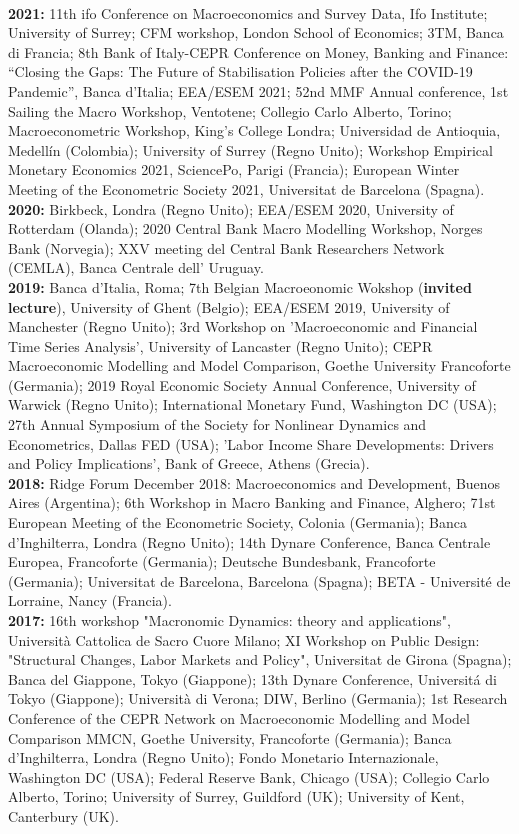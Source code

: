 \documentclass[10p]{article}
\begin{document}
\\
\textbf{2021:} {11th ifo Conference on Macroeconomics and Survey Data, Ifo Institute; University of Surrey; CFM workshop, London School of Economics; 3TM, Banca di Francia; 8th Bank of Italy-CEPR Conference on Money, Banking and Finance: “Closing the Gaps: The Future of Stabilisation Policies after the COVID-19 Pandemic”, Banca d'Italia; EEA/ESEM 2021; 52nd MMF Annual conference, 1st Sailing the Macro Workshop, Ventotene; Collegio Carlo Alberto, Torino; Macroeconometric Workshop, King's College Londra; Universidad de Antioquia, Medell\'{i}n (Colombia); University of Surrey (Regno Unito); Workshop Empirical Monetary Economics 2021, SciencePo, Parigi (Francia); European Winter Meeting of the Econometric Society 2021, Universitat de Barcelona (Spagna).}
\\
\textbf{2020:} {Birkbeck, Londra (Regno Unito); EEA/ESEM 2020, University of Rotterdam (Olanda); 2020 Central Bank Macro Modelling Workshop, Norges Bank (Norvegia); XXV meeting del Central Bank Researchers Network (CEMLA), Banca Centrale dell' Uruguay.}
\\
\textbf{2019:} {Banca d'Italia, Roma; 7th Belgian Macroeonomic Wokshop (\textbf{invited lecture}), University of Ghent (Belgio); EEA/ESEM 2019, University of Manchester (Regno Unito); 3rd Workshop on 'Macroeconomic and Financial Time Series Analysis', University of Lancaster (Regno Unito); CEPR Macroeconomic Modelling and Model Comparison, Goethe University Francoforte (Germania); 2019 Royal Economic Society Annual Conference, University of Warwick (Regno Unito); International Monetary Fund, Washington DC (USA); 27th Annual Symposium of the Society for Nonlinear Dynamics and Econometrics, Dallas FED (USA); 'Labor Income Share Developments: Drivers and Policy Implications', Bank of Greece, Athens (Grecia).}
\\
\textbf{2018:} {Ridge Forum December 2018: Macroeconomics and Development, Buenos Aires (Argentina); 6th Workshop in Macro Banking and Finance, Alghero; 71st European Meeting of the Econometric Society, Colonia (Germania); Banca d'Inghilterra, Londra (Regno Unito); 14th Dynare Conference, Banca Centrale Europea, Francoforte (Germania); Deutsche Bundesbank, Francoforte (Germania); Universitat de Barcelona, Barcelona (Spagna); BETA - Universit\'{e} de Lorraine, Nancy (Francia).} 
\\
\textbf{2017:} {16th workshop "Macronomic Dynamics: theory and applications", Universit\`{a} Cattolica de Sacro Cuore Milano;  XI Workshop on Public Design: "Structural Changes, Labor Markets and Policy", Universitat de Girona (Spagna); Banca del Giappone, Tokyo (Giappone); 13th Dynare Conference, Universit\'{a} di Tokyo (Giappone); Universit\`{a} di Verona; DIW, Berlino (Germania); 1st Research Conference of the CEPR Network on Macroeconomic Modelling and Model Comparison MMCN, Goethe University, Francoforte (Germania); Banca d'Inghilterra, Londra (Regno Unito); Fondo Monetario Internazionale, Washington DC (USA); Federal Reserve Bank, Chicago (USA); Collegio Carlo Alberto, Torino; University of Surrey, Guildford (UK); University of Kent, Canterbury (UK).} 
\end{document}
